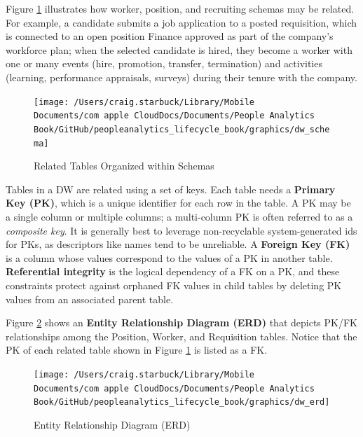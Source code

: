 \documentclass[]{book}
\begin{document}
Figure \ref{fig:dw-schema} illustrates how worker, position, and recruiting schemas may be related. For example, a candidate submits a job application to a posted requisition, which is connected to an open position Finance approved as part of the company's workforce plan; when the selected candidate is hired, they become a worker with one or many events (hire, promotion, transfer, termination) and activities (learning, performance appraisals, surveys) during their tenure with the company.

\begin{figure}

{\centering \texttt{[image: /Users/craig.starbuck/Library/Mobile Documents/com~apple~CloudDocs/Documents/People Analytics Book/GitHub/peopleanalytics\_lifecycle\_book/graphics/dw\_schema]} 

}

\caption{Related Tables Organized within Schemas}\label{fig:dw-schema}
\end{figure}

Tables in a DW are related using a set of keys. Each table needs a \textbf{Primary Key (PK)}, which is a unique identifier for each row in the table. A PK may be a single column or multiple columns; a multi-column PK is often referred to as a \emph{composite key}. It is generally best to leverage non-recyclable system-generated ids for PKs, as descriptors like names tend to be unreliable. A \textbf{Foreign Key (FK)} is a column whose values correspond to the values of a PK in another table. \textbf{Referential integrity} is the logical dependency of a FK on a PK, and these constraints protect against orphaned FK values in child tables by deleting PK values from an associated parent table.

Figure \ref{fig:dw-erd} shows an \textbf{Entity Relationship Diagram (ERD)} that depicts PK/FK relationships among the Position, Worker, and Requisition tables. Notice that the PK of each related table shown in Figure \ref{fig:dw-schema} is listed as a FK.

\begin{figure}

{\centering \texttt{[image: /Users/craig.starbuck/Library/Mobile Documents/com~apple~CloudDocs/Documents/People Analytics Book/GitHub/peopleanalytics\_lifecycle\_book/graphics/dw\_erd]} 

}

\caption{Entity Relationship Diagram (ERD)}\label{fig:dw-erd}
\end{figure}
\end{document}
